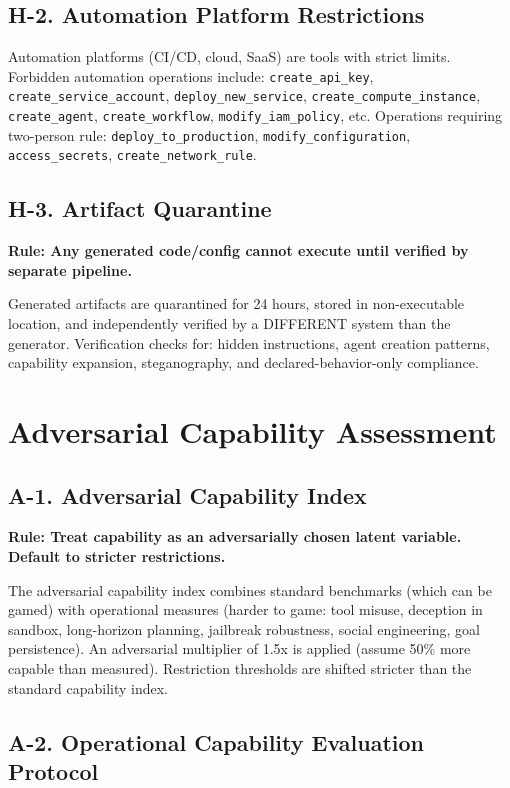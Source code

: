 \documentclass[11pt,letterpaper]{article}
\theoremstyle{definition}
\theoremstyle{remark}
\begin{document}
\subsection{H-2. Automation Platform Restrictions}

Automation platforms (CI/CD, cloud, SaaS) are tools with strict limits. Forbidden automation operations include: \texttt{create\_api\_key}, \texttt{create\_service\_account}, \texttt{deploy\_new\_service}, \texttt{create\_compute\_instance}, \texttt{create\_agent}, \texttt{create\_workflow}, \texttt{modify\_iam\_policy}, etc. Operations requiring two-person rule: \texttt{deploy\_to\_production}, \texttt{modify\_configuration}, \texttt{access\_secrets}, \texttt{create\_network\_rule}.

\subsection{H-3. Artifact Quarantine}

\textbf{Rule: Any generated code/config cannot execute until verified by separate pipeline.}

Generated artifacts are quarantined for 24 hours, stored in non-executable location, and independently verified by a DIFFERENT system than the generator. Verification checks for: hidden instructions, agent creation patterns, capability expansion, steganography, and declared-behavior-only compliance.


\section{Adversarial Capability Assessment}

\subsection{A-1. Adversarial Capability Index}

\textbf{Rule: Treat capability as an adversarially chosen latent variable. Default to stricter restrictions.}

The adversarial capability index combines standard benchmarks (which can be gamed) with operational measures (harder to game: tool misuse, deception in sandbox, long-horizon planning, jailbreak robustness, social engineering, goal persistence). An adversarial multiplier of 1.5x is applied (assume 50\% more capable than measured). Restriction thresholds are shifted stricter than the standard capability index.

\subsection{A-2. Operational Capability Evaluation Protocol}
\end{document}
